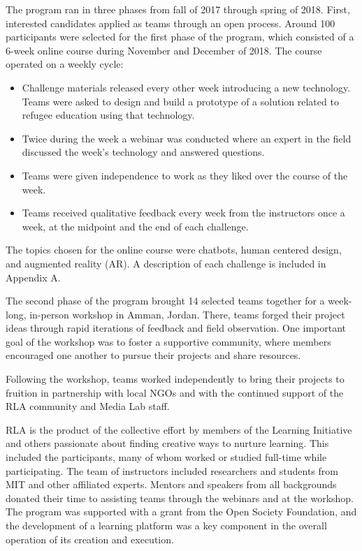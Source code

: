 \documentclass[12pt,twoside]{mitthesis}
\newcommand{\draft}[1]{{#1}}
\begin{document}
\draft{The program ran in three phases from fall of 2017 through spring of 2018. First, interested candidates applied as teams through an open process. Around 100 participants were selected for the first phase of the program, which consisted of a 6-week online course during November and December of 2018. The course operated on a weekly cycle:
\begin{itemize}
\item Challenge materials released every other week introducing a new technology. Teams were asked to design and build a prototype of a solution related to refugee education using that technology.
\item Twice during the week a webinar was conducted where an expert in the field discussed the week's technology and answered questions.
\item Teams were given independence to work as they liked over the course of the week.
\item Teams received qualitative feedback every week from the instructors once a week, at the midpoint and the end of each challenge.
\end{itemize}
The topics chosen for the online course were chatbots, human centered design, and augmented reality (AR). A description of each challenge is included in Appendix A.}

The second phase of the program brought 14 selected teams together for a week-long, in-person workshop in Amman, Jordan. There, teams forged their project ideas through rapid iterations of feedback and field observation. One important goal of the workshop was to foster a supportive community, where members encouraged one another to pursue their projects and share resources.

Following the workshop, teams worked independently to bring their projects to fruition in partnership with local NGOs and with the continued support of the RLA community and Media Lab staff.~\cite{rla}

RLA is the product of the collective effort by members of the Learning Initiative and others passionate about finding creative ways to nurture learning. This included the participants, many of whom worked or studied full-time while participating. The team of instructors included researchers and students from MIT and other affiliated experts. Mentors and speakers from all backgrounds donated their time to assisting teams through the webinars and at the workshop. The program was supported with a grant from the Open Society Foundation, and the development of a learning platform was a key component in the overall operation of its creation and execution.
\end{document}
